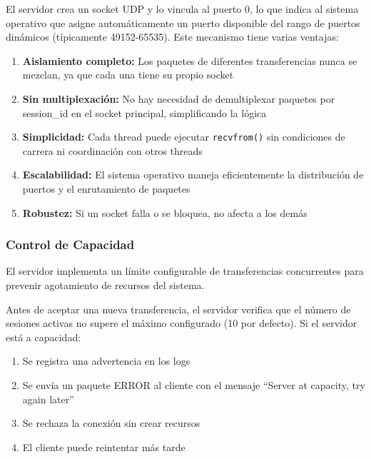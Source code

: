 El servidor crea un socket UDP y lo vincula al puerto 0, lo que indica al sistema operativo que asigne automáticamente un puerto disponible del rango de puertos dinámicos (típicamente 49152-65535). Este mecanismo tiene varias ventajas:

\begin{enumerate}
    \item \textbf{Aislamiento completo:} Los paquetes de diferentes transferencias nunca se mezclan, ya que cada una tiene su propio socket

    \item \textbf{Sin multiplexación:} No hay necesidad de demultiplexar paquetes por session\_id en el socket principal, simplificando la lógica

    \item \textbf{Simplicidad:} Cada thread puede ejecutar \texttt{recvfrom()} sin condiciones de carrera ni coordinación con otros threads

    \item \textbf{Escalabilidad:} El sistema operativo maneja eficientemente la distribución de puertos y el enrutamiento de paquetes

    \item \textbf{Robustez:} Si un socket falla o se bloquea, no afecta a los demás
\end{enumerate}

\subsubsection{Control de Capacidad}

El servidor implementa un límite configurable de transferencias concurrentes para prevenir agotamiento de recursos del sistema.

Antes de aceptar una nueva transferencia, el servidor verifica que el número de sesiones activas no supere el máximo configurado (10 por defecto). Si el servidor está a capacidad:

\begin{enumerate}
    \item Se registra una advertencia en los logs
    \item Se envía un paquete ERROR al cliente con el mensaje ``Server at capacity, try again later''
    \item Se rechaza la conexión sin crear recursos
    \item El cliente puede reintentar más tarde
\end{enumerate}

